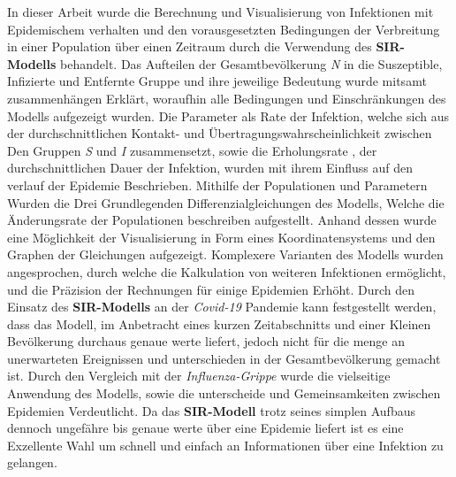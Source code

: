 \documentclass[12pt]{scrartcl} %
\begin{document}
In dieser Arbeit wurde die Berechnung und Visualisierung von Infektionen mit Epidemischem verhalten und den vorausgesetzten Bedingungen der Verbreitung in einer Population über einen Zeitraum durch die Verwendung des \textbf{SIR-Modells} behandelt. Das Aufteilen der Gesamtbevölkerung \textit{N} in die Suszeptible, Infizierte und Entfernte Gruppe und ihre jeweilige Bedeutung wurde mitsamt zusammenhängen Erklärt, woraufhin alle Bedingungen und Einschränkungen des Modells aufgezeigt wurden.
Die Parameter \textbeta\space als Rate der Infektion, welche sich aus der durchschnittlichen Kontakt- und Übertragungswahrscheinlichkeit zwischen Den Gruppen \textit{S} und \textit{I} zusammensetzt, sowie die Erholungsrate \textgamma\space, der durchschnittlichen Dauer der Infektion, wurden mit ihrem Einfluss auf den verlauf der Epidemie Beschrieben. Mithilfe der Populationen und Parametern Wurden die Drei Grundlegenden Differenzialgleichungen des Modells, Welche die Änderungsrate der Populationen beschreiben aufgestellt. Anhand dessen wurde eine Möglichkeit der Visualisierung in Form eines Koordinatensystems und den Graphen der Gleichungen aufgezeigt.
Komplexere Varianten des Modells wurden angesprochen, durch welche die Kalkulation von weiteren Infektionen ermöglicht, und die Präzision der Rechnungen für einige Epidemien Erhöht. Durch den Einsatz des \textbf{SIR-Modells} an der \textsl{Covid-19} Pandemie kann festgestellt werden, dass das Modell, im Anbetracht eines kurzen Zeitabschnitts und einer Kleinen Bevölkerung durchaus genaue werte liefert, jedoch nicht für die menge an unerwarteten Ereignissen und unterschieden in der Gesamtbevölkerung gemacht ist. Durch den Vergleich mit der \textsl{Influenza-Grippe} wurde die vielseitige Anwendung des Modells, sowie die unterscheide und Gemeinsamkeiten zwischen Epidemien Verdeutlicht.
Da das \textbf{SIR-Modell} trotz seines simplen Aufbaus dennoch ungefähre bis genaue werte über eine Epidemie liefert ist es eine Exzellente Wahl um schnell und einfach an Informationen über eine Infektion zu gelangen.


\newpage
\setlength{\bibitemsep}{\baselineskip}
\printbibliography[heading=bibintoc]
\thispagestyle{empty}
\listoffigures
\end{document}
